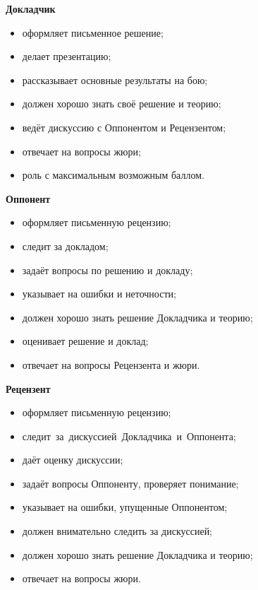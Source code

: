 \documentclass[11pt]{beamer}
\newcommand\fram[2]{\begin{frame}{\bf #1} #2 \end{frame}}
\begin{document}
\fram{Докладчик}{
\Large
\begin{itemize}
\item оформляет письменное решение;\vspace{1mm}
\item делает презентацию;\vspace{1mm}
\item рассказывает основные результаты на бою;\vspace{1mm}
\item должен хорошо знать своё решение и теорию;\vspace{1mm}
\item ведёт дискуссию с Оппонентом и Рецензентом;\vspace{1mm}
\item отвечает на вопросы жюри;\vspace{1mm}
\item роль с максимальным возможным баллом.
\end{itemize}
}

\fram{Оппонент}{
\Large
\begin{itemize}
	\item оформляет письменную рецензию;\vspace{1mm}
	\item следит за докладом;\vspace{1mm}
	\item задаёт вопросы по решению и докладу;\vspace{1mm}
	\item указывает на ошибки и неточности;\vspace{1mm}
	\item должен хорошо знать решение \linebreak Докладчика  и теорию;\vspace{1mm}
	\item оценивает решение и доклад;\vspace{1mm}
	\item отвечает на вопросы Рецензента и жюри.
\end{itemize}
}

\fram{Рецензент}{
\Large
\begin{itemize}
	\item оформляет письменную рецензию;\vspace{1mm}
	\item следит~за~дискуссией~Докладчика~и~Оппонента;
	\item даёт оценку дискуссии;
	\item задаёт вопросы Оппоненту, \linebreak проверяет понимание;
	\item указывает на ошибки, упущенные Оппонентом;
	\item должен внимательно следить за дискуссией;
	\item должен хорошо знать решение \linebreak Докладчика  и теорию;
	\item отвечает на вопросы жюри.
\end{itemize}
}
\end{document}

